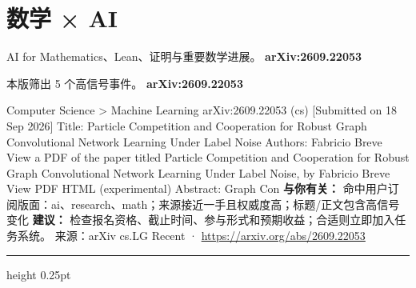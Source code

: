 \documentclass[10.5pt]{ctexart}
\begin{document}
\section*{数学 × AI}
{\color{ormuted} AI for Mathematics、Lean、证明与重要数学进展。}
\vspace{2mm}
{\LARGE\bfseries arXiv:2609.22053}\par
\vspace{1mm}
{\color{ormuted} 本版筛出 5 个高信号事件。}
\vspace{3mm}
{\Large\bfseries arXiv:2609.22053}\par
Computer Science > Machine Learning arXiv:2609.22053 (cs) [Submitted on 18 Sep 2026] Title: Particle Competition and Cooperation for Robust Graph Convolutional Network Learning Under Label Noise Authors: Fabricio Breve View a PDF of the paper titled Particle Competition and Cooperation for Robust Graph Convolutional Network Learning Under Label Noise, by Fabricio Breve View PDF HTML (experimental) Abstract: Graph Con
\textbf{与你有关：} 命中用户订阅版面：ai、research、math；来源接近一手且权威度高；标题/正文包含高信号变化
\textbf{建议：} 检查报名资格、截止时间、参与形式和预期收益；合适则立即加入任务系统。
{\footnotesize\color{ormuted} 来源：arXiv cs.LG Recent · \url{https://arxiv.org/abs/2609.22053}}
\vspace{4mm}
\hrule height 0.25pt
\vspace{3mm}
\end{document}
